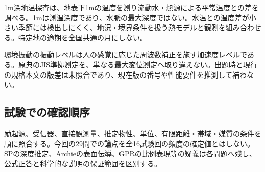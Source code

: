 1m深地温探査は、地表下1mの温度を測り流動水・熱源による平常温度との差を調べる。1mは測温深度であり、水脈の最大深度ではない。水温との温度差が小さい季節には検出しにくく、地況・境界条件を扱う熱モデルと観測を組み合わせる\cite{naro_thermal2008,landslide_thermal2007}。特定地の適期を全国共通の月にしない。

環境振動の振動レベルは人の感覚に応じた周波数補正を施す加速度レベルである。原典のJIS準拠測定を、単なる最大変位測定へ取り違えない\cite{rion_vibration2016}。出題時と現行の規格本文の版差は未照合であり、現在版の番号や性能要件を推測して補わない。

\subsection*{試験での確認順序}
励起源、受信器、直接観測量、推定物性、単位、有限距離・帯域・媒質の条件を順に照合する。今回の29問での論点を全16試験回の頻度の確定値とはしない。SPの深度推定、Archieの表面伝導、GPRの比例表現等の疑義は各問題へ残し、公式正答と科学的な説明の保証範囲を区別する。
